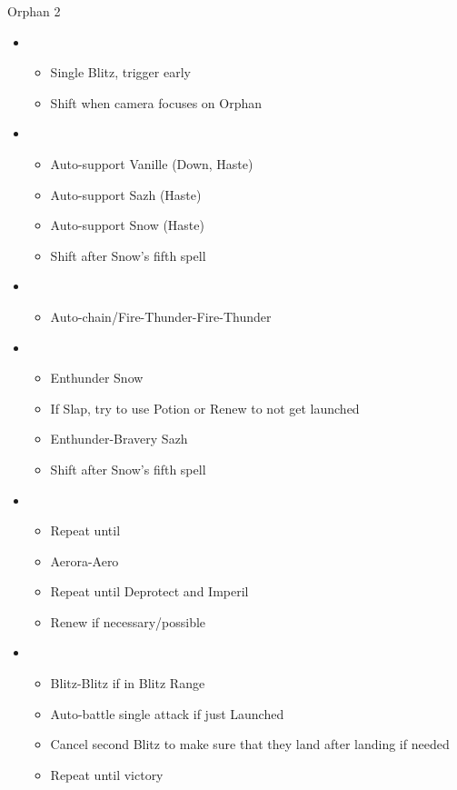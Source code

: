 \begin{battle}{Orphan 2}
  \begin{multicols}{2}
    \begin{itemize}
      \item \second
            \begin{itemize}
              \item Single Blitz, trigger early
              \item Shift when camera focuses on Orphan
            \end{itemize}
      \item \fourth
            \begin{itemize}
              \item Auto-support Vanille (Down, Haste)
              \item Auto-support Sazh (Haste)
              \item Auto-support Snow (Haste)
              \item Shift after Snow's fifth spell
            \end{itemize}
      \item \sixth
            \begin{itemize}
              \item Auto-chain/Fire-Thunder-Fire-Thunder
            \end{itemize}
      \item \fourth
            \begin{itemize}
              \item Enthunder Snow
              \item If Slap, try to use Potion or Renew to not get launched
              \item Enthunder-Bravery Sazh
              \item Shift after Snow's fifth spell
            \end{itemize}
            \columnbreak
      \item \fifth
            \begin{itemize}
              \item Repeat until \stagger
              \item Aerora-Aero
              \item Repeat until Deprotect and Imperil
              \item Renew if necessary/possible
            \end{itemize}
      \item \first
            \begin{itemize}
              \item Blitz-Blitz if in Blitz Range
              \item Auto-battle single attack if just Launched
              \item Cancel second Blitz to make sure that they land after landing if needed
              \item Repeat until victory
            \end{itemize}
    \end{itemize}
  \end{multicols}
\end{battle}
